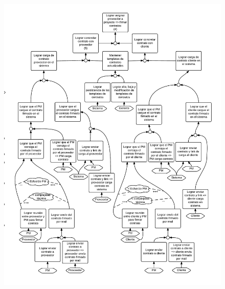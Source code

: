 \begin{figure}[H]
\includegraphics[width=\textwidth, clip=true, trim=15pt 0pt 15pt 0pt]{imagenes/objetivos/objetivos13.pdf}
\end{figure}

\newpage
